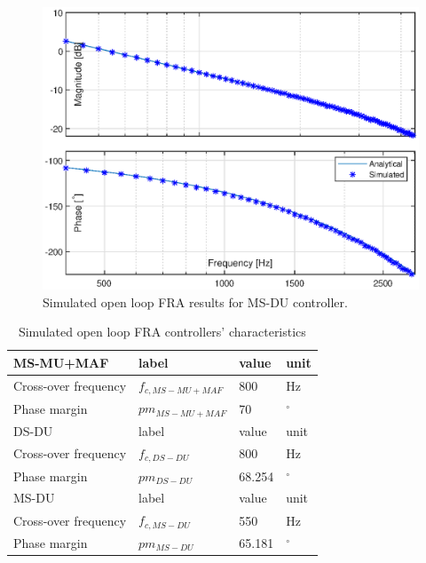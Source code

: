 \documentclass[journal]{IEEEtran}
\begin{document}
\begin{figure}[t!]
    \centerline{\includegraphics[width=0.95\linewidth]{figures/MSDU_olfra.eps}}
    \caption{Simulated open loop FRA results for MS-DU controller.}
    \label{fig:MSDU_olfra} 
\end{figure}

\begin{table}[h!]
			  \caption{Simulated open loop FRA controllers' characteristics}
              \label{tab:sym_param}
              \centering
              \begin{tabular}{llll}
                           \midrule\midrule
        MS-MU+MAF & label & value   & unit\\
        \midrule               
                  Cross-over frequency  & $f_{c,MS-MU+MAF}$ & 800 & Hz   \\
                  Phase margin  & $pm_{MS-MU+MAF}$ & 70 &  $^\circ$  \\
                  \midrule\midrule
        DS-DU & label & value   & unit\\
        \midrule               
                  Cross-over frequency  & $f_{c,DS-DU}$ & 800 & Hz   \\
                  Phase margin  & $pm_{DS-DU}$ & 68.254 &  $^\circ$  \\
                  \midrule\midrule
        MS-DU & label & value   & unit\\
        \midrule               
                  Cross-over frequency  & $f_{c,MS-DU}$ & 550 & Hz   \\
                  Phase margin  & $pm_{MS-DU}$ & 65.181 &  $^\circ$  \\
                  \midrule\midrule
                                                        
              \end{tabular}
\end{table}
\end{document}
